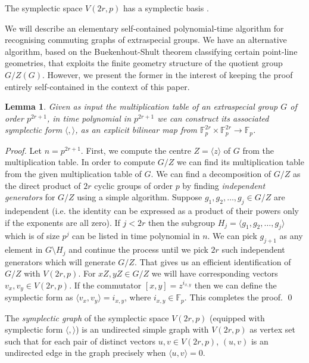 \documentclass{elsarticle}
\newtheorem{lemma}[theorem]{Lemma}
\newcommand{\F}{\mathbb{F}}
\renewcommand{\angle}[1]{\langle#1\rangle} %
\newcommand{\sympl}[1]{\langle #1 \rangle}
\begin{document}
The symplectic space $V(2r,p)$ has a symplectic basis \cite[Section
3.4.4]{Wilson-book}.

\begin{remark}
  We will describe an elementary self-contained polynomial-time
  algorithm for recognising commuting graphs of extraspecial
  groups. We have an alternative algorithm, based on the
  Buekenhout-Shult theorem \cite{bs} classifying certain point-line
  geometries, that exploits the finite geometry structure of the
  quotient group $G/Z(G)$. However, we present the former in the
  interest of keeping the proof entirely self-contained in the
  context of this paper.
\end{remark}

\begin{lemma}\label{G-to-sympl}
  Given as input the multiplication table of an extraspecial group $G$
  of order $p^{2r+1}$, in time polynomial in $p^{2r+1}$ we can
  construct its associated symplectic form $\sympl{,}$, as an explicit
  bilinear map from $\F_p^{2r}\times \F_p^{2r}\to \F_p$.
\end{lemma}

\begin{proof}
  Let $n=p^{2r+1}$. First, we compute the centre $Z=\angle{z}$ of $G$
  from the multiplication table. In order to compute $G/Z$ we can find
  its multiplication table from the given multiplication table of $G$.
  We can find a decomposition of $G/Z$ as the direct product of $2r$
  cyclic groups of order $p$ by finding \emph{independent generators}
  for $G/Z$ using a simple algorithm. Suppose
  $g_1,g_2,\ldots,g_j\in G/Z$ are independent (i.e. the identity can
  be expressed as a product of their powers only if the exponents are
  all zero). If $j<2r$ then the subgroup
  $H_j=\angle{g_1,g_2,\ldots,g_j}$ which is of size $p^j$ can be
  listed in time polynomial in $n$. We can pick $g_{j+1}$ as any
  element in $G\setminus H_j$ and continue the process until we pick
  $2r$ such independent generators which will generate $G/Z$.  That
  gives us an efficient identification of $G/Z$ with $V(2r,p)$.  For
  $xZ,yZ\in G/Z$ we will have corresponding vectors
  $v_x,v_y\in V(2r,p)$. If the commutator $[x,y]=z^{i_{x,y}}$ then we
  can define the symplectic form as $\sympl{v_x,v_y}=i_{x,y}$, where
  $i_{x,y}\in \F_p$. This completes the proof. \qed
\end{proof}

\begin{defn}\label{orth-graph-def}
The \emph{symplectic graph} of the symplectic space $V(2r,p)$
(equipped with symplectic form $\sympl{,}$) is an undirected simple
graph with $V(2r,p)$ as vertex set such that for each pair of distinct
vectors $u,v\in V(2r,p)$, $(u,v)$ is an undirected edge in the graph
precisely when $\sympl{u,v}=0$.
\end{defn}
\end{document}
